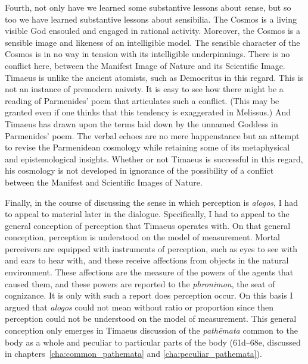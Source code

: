 Fourth, not only have we learned some substantive lessons about sense, but so too we have learned substantive lessons about sensibilia. The Cosmos is a living visible God ensouled and engaged in rational activity. Moreover, the Cosmos is a sensible image and likeness of an intelligible model. The sensible character of the Cosmos is in no way in tension with its intelligible underpinnings. There is no conflict here, between the Manifest Image of Nature and its Scientific Image. Timaeus is unlike the ancient atomists, such as Democritus in this regard. This is not an instance of premodern naivety. It is easy to see how there might be a reading of Parmenides' poem that articulates such a conflict. (This may be granted even if one thinks that this tendency is exaggerated in Melissus.) And Timaeus has drawn upon the terms laid down by the unnamed Goddess in Parmenides' poem. The verbal echoes are no mere happenstance but an attempt to revise the Parmenidean cosmology while retaining some of its metaphysical and epistemological insights. Whether or not Timaeus is successful in this regard, his cosmology is not developed in ignorance of the possibility of a conflict between the Manifest and Scientific Images of Nature. 

Finally, in the course of discussing the sense in which perception is \emph{alogos}, I had to appeal to material later in the dialogue. Specifically, I had to appeal to the general conception of perception that Timaeus operates with. On that general conception, perception is understood on the model of measurement. Mortal perceivers are equipped with instruments of perception, such as eyes to see with and ears to hear with, and these receive affections from objects in the natural environment. These affections are the measure of the powers of the agents that caused them, and these powers are reported to the \emph{phronimon}, the seat of cognizance. It is only with such a report does perception occur. On this basis I argued that \emph{alogos} could not mean without ratio or proportion since then perception could not be understood on the model of measurement. This general conception only emerges in Timaeus discussion of the \emph{pathēmata} common to the body as a whole and peculiar to particular parts of the body (61d–68e, discussed in chapters~\ref{cha:common_pathemata} and \ref{cha:peculiar_pathemata}).


